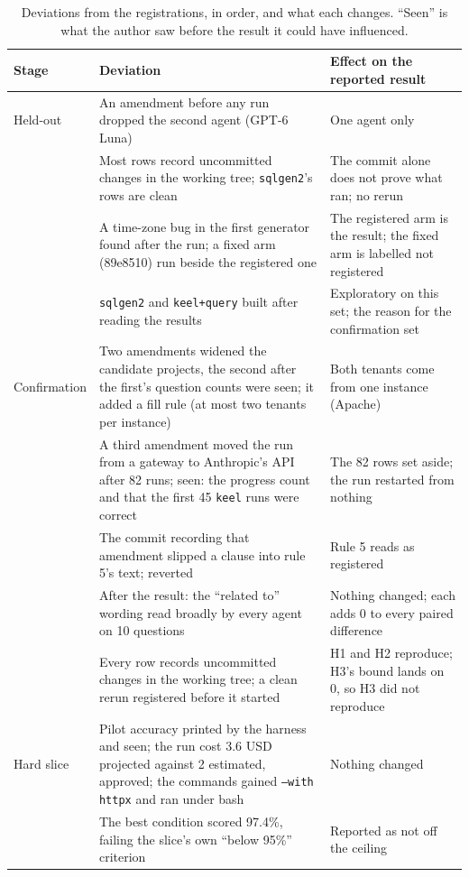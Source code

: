 \documentclass[sigconf, nonacm]{acmart}
\newcommand{\code}[1]{\texttt{#1}}
\begin{document}
\begin{table}[t]
\caption{Deviations from the registrations, in order, and what each changes. ``Seen'' is what the author saw before the result it could have influenced.}
\label{tab:deviations}
\centering
\footnotesize
\begin{tabularx}{\textwidth}{P{0.75in} L L}
\toprule
Stage & Deviation & Effect on the reported result \\
\midrule
Held-out & An amendment before any run dropped the second agent (GPT-6 Luna) & One agent only \\
 & Most rows record uncommitted changes in the working tree; \code{sqlgen2}'s rows are clean & The commit alone does not prove what ran; no rerun \\
 & A time-zone bug in the first generator found after the run; a fixed arm (89e8510) run beside the registered one & The registered arm is the result; the fixed arm is labelled not registered \\
 & \code{sqlgen2} and \code{keel+query} built after reading the results & Exploratory on this set; the reason for the confirmation set \\
Confirmation & Two amendments widened the candidate projects, the second after the first's question counts were seen; it added a fill rule (at most two tenants per instance) & Both tenants come from one instance (Apache) \\
 & A third amendment moved the run from a gateway to Anthropic's API after 82 runs; seen: the progress count and that the first 45 \code{keel} runs were correct & The 82 rows set aside; the run restarted from nothing \\
 & The commit recording that amendment slipped a clause into rule 5's text; reverted & Rule 5 reads as registered \\
 & After the result: the ``related to'' wording read broadly by every agent on 10 questions & Nothing changed; each adds 0 to every paired difference \\
 & Every row records uncommitted changes in the working tree; a clean rerun registered before it started & H1 and H2 reproduce; H3's bound lands on 0, so H3 did not reproduce \\
Hard slice & Pilot accuracy printed by the harness and seen; the run cost 3.6 USD projected against 2 estimated, approved; the commands gained \code{--with httpx} and ran under bash & Nothing changed \\
 & The best condition scored 97.4\%, failing the slice's own ``below 95\%'' criterion & Reported as not off the ceiling \\

\end{tabularx}
\end{table}
\end{document}
